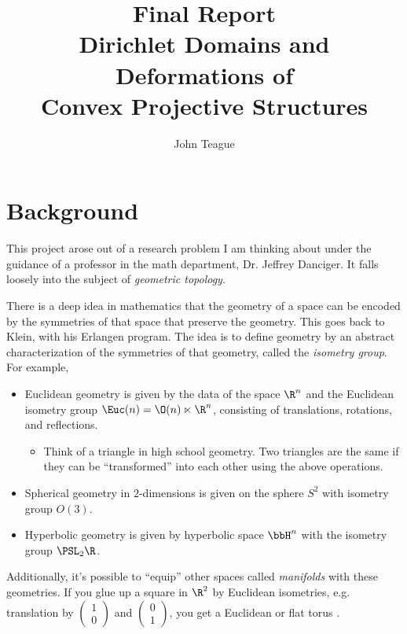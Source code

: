\documentclass[12pt]{article}%
\begin{document}
\title{Final Report\\ \vspace{0.1in}
\Large Dirichlet Domains and Deformations of\\
Convex Projective Structures}
\author{John Teague}
\maketitle

\section{Background}

This project arose out of a research problem I am thinking about under the guidance of a professor in the math department, Dr. Jeffrey Danciger. It falls loosely into the subject of \textit{geometric topology}.


There is a deep idea in mathematics that the geometry of a space can be encoded by the symmetries of that space that preserve the geometry. This goes back to Klein, with his Erlangen program. The idea is to define geometry by an abstract characterization of the symmetries of that geometry, called the \textit{isometry group}. For example, 
\begin{itemize}
	\item Euclidean geometry is given by the data of the space $\R^n$ and the Euclidean isometry group $\Euc(n) = \O(n) \ltimes \R^n$, consisting of translations, rotations, and reflections.
	\begin{itemize}
		\item Think of a triangle in high school geometry. Two triangles are the same if they can be ``transformed'' into each other using the above operations.
	\end{itemize}
	\item Spherical geometry in $2$-dimensions is given on the sphere $S^2$ with isometry group $O(3)$.
	\item Hyperbolic geometry is given by hyperbolic space $\bbH^n$ with the isometry group $\PSL_2\R$.
\end{itemize}
Additionally, it's possible to ``equip'' other spaces called \textit{manifolds} with these geometries. If you glue up a square in $\R^2$ by Euclidean isometries, e.g. translation by $\begin{pmatrix} 1\\0 \end{pmatrix}$ and $\begin{pmatrix} 0\\1 \end{pmatrix}$, you get a Euclidean or flat torus \cite{ballas}.
\end{document}
